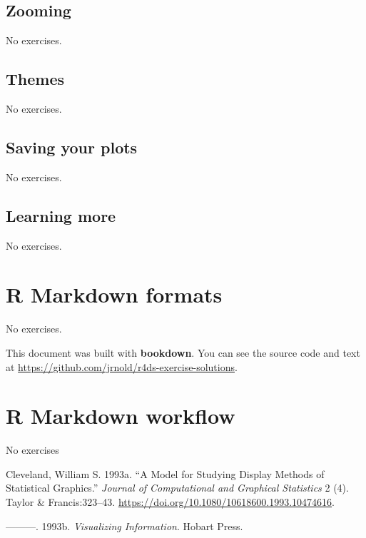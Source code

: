 \documentclass[]{book}
\theoremstyle{plain}
\theoremstyle{remark}
\begin{document}
\hypertarget{zooming}{%
\section{Zooming}\label{zooming}}

No exercises.

\hypertarget{themes}{%
\section{Themes}\label{themes}}

No exercises.

\hypertarget{saving-your-plots}{%
\section{Saving your plots}\label{saving-your-plots}}

No exercises.

\hypertarget{learning-more-2}{%
\section{Learning more}\label{learning-more-2}}

No exercises.

\hypertarget{r-markdown-formats}{%
\chapter{R Markdown formats}\label{r-markdown-formats}}

No exercises.

This document was built with \textbf{bookdown}. You can see the source
code and text at
\url{https://github.com/jrnold/r4ds-exercise-solutions}.

\hypertarget{r-markdown-workflow}{%
\chapter{R Markdown workflow}\label{r-markdown-workflow}}

No exercises

\hypertarget{refs}{}
\leavevmode\hypertarget{ref-Cleveland1993a}{}%
Cleveland, William S. 1993a. ``A Model for Studying Display Methods of
Statistical Graphics.'' \emph{Journal of Computational and Graphical
Statistics} 2 (4). Taylor \& Francis:323--43.
\url{https://doi.org/10.1080/10618600.1993.10474616}.

\leavevmode\hypertarget{ref-Cleveland1993}{}%
---------. 1993b. \emph{Visualizing Information}. Hobart Press.
\end{document}
